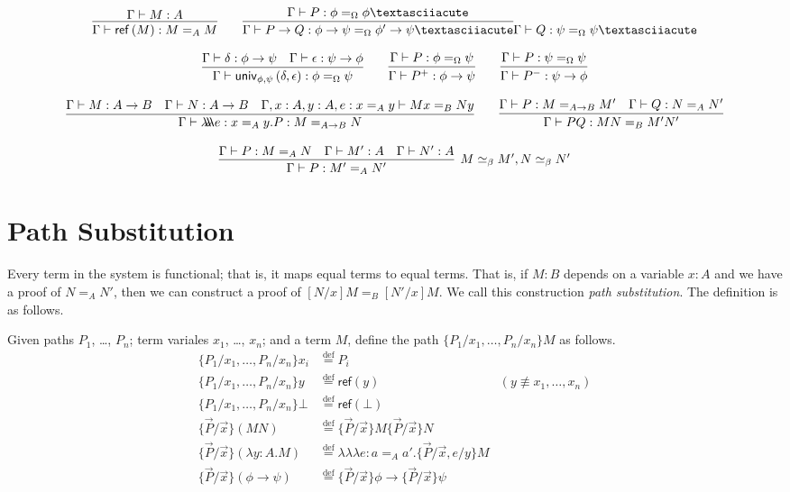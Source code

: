 \documentclass{easychair}
\newcommand{\univ}[4]{\mathsf{univ}_{{#1},{#2}} \left( {#3} , {#4} \right)}
\newcommand{\triplelambda}{\lambda \!\! \lambda \!\! \lambda}
\newcommand{\reff}[1]{\mathsf{ref} \left( {#1} \right)}
\newcommand{\eqdef}{\stackrel{\mathrm{def}}{=}}
\begin{document}
\[ \infer{\Gamma \vdash \reff{M} : M =_A M}{\Gamma \vdash M : A}
\qquad
\infer{\Gamma \vdash P \rightarrow Q : \phi \rightarrow \psi =_\Omega \phi' \rightarrow \psi´}{\Gamma \vdash P : \phi =_\Omega \phi´}{\Gamma \vdash Q : \psi =_\Omega \psi´} \]

\[ \infer{\Gamma \vdash \univ{\phi}{\psi}{\delta}{\epsilon} : \phi =_\Omega \psi}{\Gamma \vdash \delta : \phi \rightarrow \psi \quad \Gamma \vdash \epsilon : \psi \rightarrow \phi} 
\qquad
\infer{\Gamma \vdash P^+ : \phi \rightarrow \psi}{\Gamma \vdash P : \phi =_\Omega \psi}
\qquad
\infer{\Gamma \vdash P^- : \psi \rightarrow \phi}{\Gamma \vdash P : \psi =_\Omega \psi} \]

\[ \infer{\Gamma \vdash \triplelambda e : x =_A y . P : M =_{A \rightarrow B} N}{\Gamma \vdash M : A \rightarrow B \quad \Gamma \vdash N : A \rightarrow B \quad
\Gamma, x : A, y : A, e : x =_A y \vdash M x =_B N y}
\qquad
\infer{\Gamma \vdash PQ : MN =_B M' N'}{\Gamma \vdash P : M =_{A \rightarrow B} M' \quad \Gamma \vdash Q : N =_A N'} \]

\[ \infer[M \simeq_\beta M', N \simeq_\beta N']{\Gamma \vdash P : M' =_A N'}{\Gamma \vdash P : M =_A N \quad \Gamma \vdash M' : A \quad \Gamma \vdash N' : A} \]

\section{Path Substitution}

Every term in the system is functional; that is, it maps equal terms to equal terms.  That is, if $M : B$ depends on a variable $x : A$ and we have a proof of $N =_A N'$,
then we can construct a proof of $[N/x]M =_B [N'/x]M$.  We call this construction \emph{path substitution}.  The definition is as follows.

Given paths $P_1$, \ldots, $P_n$; term variales $x_1$, \ldots, $x_n$; and a term $M$, define the path $\{ P_1 / x_1, \ldots, P_n / x_n \} M$ as follows.
\begin{align*}
\{ P_1 / x_1, \ldots, P_n / x_n \} x_i & \eqdef P_i \\
\{ P_1 / x_1, \ldots, P_n / x_n \} y & \eqdef \reff{y} & (y \not\equiv x_1, \ldots, x_n) \\
\{ P_1 / x_1, \ldots, P_n / x_n \} \bot & \eqdef \reff{\bot} \\
\{ \vec{P} / \vec{x} \} (MN) & \eqdef \{ \vec{P} / \vec{x} \} M \{ \vec{P} / \vec{x} \} N \\
\{ \vec{P} / \vec{x} \} (\lambda y : A . M) & \eqdef \triplelambda e : a =_A a' . \{ \vec{P} / \vec{x} , e / y \} M \\
\{ \vec{P} / \vec{x} \} (\phi \rightarrow \psi) & \eqdef \{ \vec{P} / \vec{x} \} \phi \rightarrow \{ \vec{P} / \vec{x} \} \psi
\end{align*}
\end{document}
